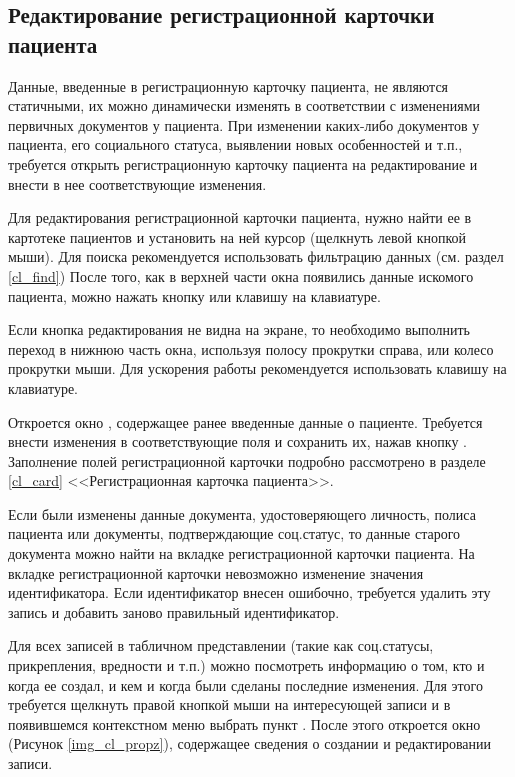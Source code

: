 \subsection{Редактирование регистрационной карточки пациента}

Данные, введенные в регистрационную карточку пациента, не являются статичными, их можно динамически изменять в соответствии с изменениями первичных документов у пациента. При изменении каких-либо документов у пациента, его социального статуса, выявлении новых особенностей и т.п., требуется открыть регистрационную карточку пациента на редактирование и внести в нее соответствующие изменения. 

Для редактирования регистрационной карточки пациента, нужно найти ее в картотеке пациентов и установить на ней курсор (щелкнуть левой кнопкой мыши). Для поиска рекомендуется использовать фильтрацию данных (см. раздел \ref{cl_find}) После того, как в верхней части окна появились данные искомого пациента, можно нажать кнопку   или клавишу  на клавиатуре.

\begin{vnim}
Если кнопка редактирования не видна на экране, то необходимо выполнить переход в нижнюю часть окна, используя полосу прокрутки справа, или колесо прокрутки мыши. Для ускорения работы рекомендуется использовать клавишу  на клавиатуре.
\end{vnim}
 
Откроется окно , содержащее ранее введенные данные о пациенте. Требуется внести изменения в соответствующие поля и сохранить их, нажав кнопку . Заполнение полей регистрационной карточки подробно рассмотрено в разделе \ref{cl_card} <<Регистрационная карточка пациента>>.

Если были изменены данные документа, удостоверяющего личность, полиса пациента или документы, подтверждающие соц.статус, то данные старого документа можно найти на вкладке  регистрационной карточки пациента. 
На вкладке  регистрационной карточки невозможно изменение значения идентификатора. Если идентификатор внесен ошибочно, требуется удалить эту запись и добавить заново правильный идентификатор.

Для всех записей в табличном представлении (такие как соц.статусы, прикрепления, вредности и т.п.) можно посмотреть информацию о том, кто и когда ее создал, и кем и когда были сделаны последние изменения. Для этого требуется щелкнуть правой кнопкой мыши на интересующей записи и в появившемся контекстном меню выбрать пункт . После этого откроется окно (Рисунок \ref{img_cl_propz}), содержащее сведения о создании и редактировании записи.

